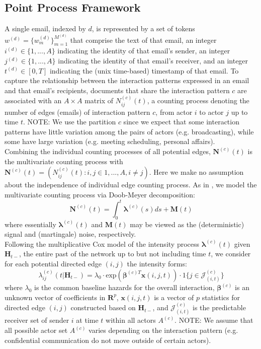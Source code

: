 \documentclass[a4paper]{article}
\begin{document}
\subsection{Point Process Framework}
A single email, indexed by $d$, is represented by a set of tokens $w^{(d)} = \{w^{(d)}_m \}_{m=1}^{M^{(d)}}$ that comprise the
text of that email, an integer $i^{(d)} \in \{1,...,A\}$ indicating the identity of that email’s sender, an integer $j^{(d)} \in \{1,...,A\}$ indicating the identity of that email’s receiver, and an integer $t^{(d)} \in [0, T]$ indicating the (unix time-based) timestamp of that email. To capture the relationship between the interaction patterns expressed in an email and that email’s recipients, documents that share the interaction pattern $c$ are associated with an $A\times A$ matrix of $N^{(c)}_{ij}(t)$, a counting process denoting the number of edges (emails) of interaction pattern $c$, from actor $i$ to actor $j$ up to time $t$. NOTE: We use the partition $c$ since we expect that some interaction patterns have little variation among the pairs of actors (e.g. broadcasting), while some have large variation (e.g. meeting scheduling, personal affairs). \\ \newline Combining the individual counting processes of all potential edges,  $\mathbf{N}^{(c)}(t)$ is the multivariate counting process with $\mathbf{N}^{(c)}(t)=(N^{(c)}_{ij}(t): i, j \in {1, ..., A}, i \neq j)$. Here we make no assumption about the independence of individual edge counting process. As in \cite{Vu2011}, we model the multivariate counting process via Doob-Meyer decomposition:
\begin{equation}
\mathbf{N}^{(c)}(t)=\int_0^t\boldsymbol{\lambda}^{(c)}(s)ds + \mathbf{M}(t)
\end{equation}
where essentially $\boldsymbol{\lambda}^{(c)}(t)$ and $\mathbf{M}(t)$ may be viewed as the (deterministic) signal and (martingale) noise, respectively.\\ \newline
Following the multiplicative Cox model of the intensity process $\boldsymbol{\lambda}^{(c)}(t)$ given $\boldsymbol{H}_{t-}$, the entire past of the network up to but not including time $t$, we consider for each potential directed edge $(i, j)$ the intensity forms:
\begin{equation}
\lambda^{(c)}_{ij}(t|\boldsymbol{H}_{t-})=\lambda_0\cdot \mbox{exp}(\boldsymbol{\beta}^{(c)T}\boldsymbol{x}(i, j, t))\cdot 1\{j \in \mathcal{J}^{(c)}_{(i, t)}\}
\end{equation}
where $\lambda_0$ is the common baseline hazards for the overall interaction, $\boldsymbol{\beta}^{(c)}$ is an unknown vector of coefficients in $\boldsymbol{R}^{p}$, $\boldsymbol{x}(i, j, t)$ is a vector of $p$ statistics for directed edge $(i, j)$ constructed based on
$\boldsymbol{H}_{t-}$, and $\mathcal{J}^{(c)}_{(i, t)}$ is the predictable receiver set of sender $i$ at time $t$ within all actors $A^{(c)}$. NOTE: We assume that all possible actor set $A^{(c)}$ varies depending on the interaction pattern (e.g. confidential communication do not move outside of certain actors).
\end{document}
